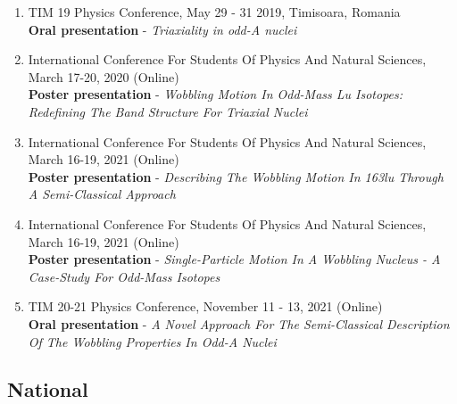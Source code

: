 \begin{enumerate}
    \item TIM 19 Physics Conference, May 29 - 31 2019, Timisoara, Romania \\
    \textbf{Oral presentation} - \emph{Triaxiality in odd-A nuclei}
    \item International Conference For Students Of Physics And Natural Sciences, March 17-20, 2020 (Online) \\
    \textbf{Poster presentation} - \emph{Wobbling Motion In Odd-Mass Lu Isotopes: Redefining The Band Structure For Triaxial Nuclei}
    \item International Conference For Students Of Physics And Natural Sciences, March 16-19, 2021 (Online) \\
    \textbf{Poster presentation} - \emph{Describing The Wobbling Motion In 163lu Through A Semi-Classical Approach}
    \item International Conference For Students Of Physics And Natural Sciences, March 16-19, 2021 (Online) \\
    \textbf{Poster presentation} - \emph{Single-Particle Motion In A Wobbling Nucleus - A Case-Study For Odd-Mass Isotopes}
    \item TIM 20-21 Physics Conference, November 11 - 13, 2021 (Online) \\
    \textbf{Oral presentation} - \emph{A Novel Approach For The Semi-Classical Description Of The Wobbling Properties In Odd-A Nuclei}

\end{enumerate}

\subsection{National}